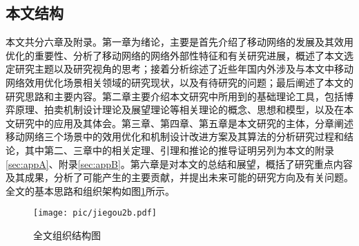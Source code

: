
\subsection{本文结构}

本文共分六章及附录。第一章为绪论，主要是首先介绍了移动网络的发展及其效用优化的重要性、分析了移动网络的网络外部性特征和有关研究进展，概述了本文选定研究主题以及研究视角的思考；接着分析综述了近些年国内外涉及与本文中移动网络效用优化场景相关领域的研究现状，以及有待研究的问题；最后阐述了本文的研究思路和主要内容。第二章主要介绍本文研究中所用到的基础理论工具，包括博弈原理、拍卖机制设计理论及展望理论等相关理论的概念、思想和模型，以及在本文研究中的应用及其体会。第三章、第四章、第五章是本文研究的主体，分章阐述移动网络三个场景中的效用优化和机制设计改进方案及其算法的分析研究过程和结论，其中第二、三章中的相关定理、引理和推论的推导证明另列为本文的附录\ref{sec:appA}、附录\ref{sec:appB}。第六章是对本文的总结和展望，概括了研究重点内容及其成果，分析了可能产生的主要贡献，并提出未来可能的研究方向及有关问题。全文的基本思路和组织架构如图\ref{fig:the}所示。

\begin{figure}[t]
\centering
\texttt{[image: pic/jiegou2b.pdf]}
\caption{全文组织结构图}
\label{fig:the}
\end{figure}